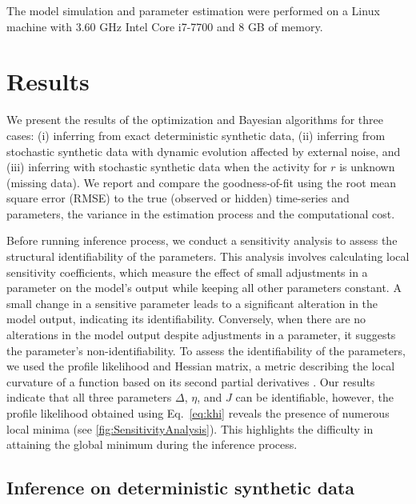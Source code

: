 \documentclass[preprint,11pt,authoryear]{elsarticle}
\begin{document}
The model simulation and parameter estimation were performed on a Linux machine with 3.60 GHz Intel Core i7-7700 and 8 GB of memory.






\section{Results}
\label{Results}

We present the results of the optimization and Bayesian algorithms for three cases: (i) inferring from exact deterministic synthetic data, (ii) inferring from stochastic synthetic data with dynamic evolution affected by external noise, and (iii) inferring with stochastic synthetic data when the activity for $r$ is unknown (missing data).  We report and compare the goodness-of-fit using the root mean square error (RMSE) to the true (observed or hidden) time-series and parameters, the variance in the estimation process and the computational cost.



Before running inference process, we conduct a sensitivity analysis to assess the structural identifiability of the parameters. This analysis involves calculating local sensitivity coefficients, which measure the effect of small adjustments in a parameter on the model's output while keeping all other parameters constant. A small change in a sensitive parameter leads to a significant alteration in the model output, indicating its identifiability. Conversely, when there are no alterations in the model output despite adjustments in a parameter, it suggests the parameter's non-identifiability. To assess the identifiability of the parameters, we used the profile likelihood \citep{Raue2009, Wieland2021} and Hessian matrix, a metric describing the local curvature of a function based on its second partial derivatives \citep{Hashemi2018, Hashemi2023}. Our results indicate that all three parameters $\Delta$, $\eta$, and $J$ can be identifiable, however, the profile likelihood obtained using Eq.~\ref{eq:khi} reveals the presence of numerous local minima (see \autoref{fig:SensitivityAnalysis}). This highlights the difficulty in attaining the global minimum during the inference process.



\subsection{Inference on deterministic synthetic data}
\end{document}
